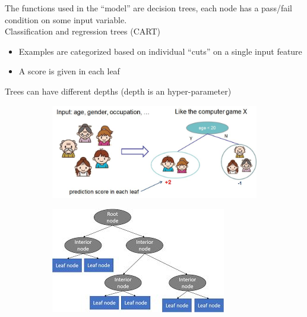 The functions used in the “model” are decision trees, each node has a pass/fail condition on some input variable.\\
Classification and regression trees (CART)
\begin{itemize}
	\item Examples are categorized based on individual “cuts” on a single input feature
	\item A score is given in each leaf
\end{itemize}
Trees can have different depths (depth is an hyper-parameter)

\begin{figure}[ht]
	\centering
	\begin{subfigure}{.5\textwidth}
		\centering
		\includegraphics[width=1\linewidth]{figure_ml/decision_trees.png}
	\end{subfigure}%
	\begin{subfigure}{.5\textwidth}
		\centering
		\includegraphics[width=1\linewidth]{figure_ml/decision_trees2.png}
	\end{subfigure}
\end{figure}



